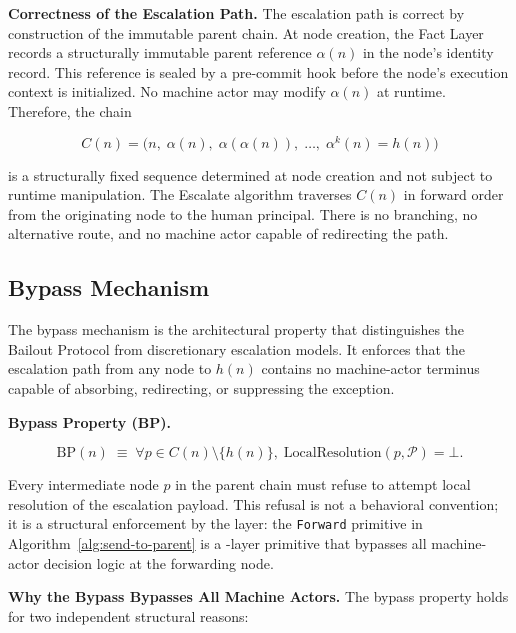 \textbf{Correctness of the Escalation Path.} The escalation path is correct by construction of the immutable parent chain. At node creation, the Fact Layer records a structurally immutable parent reference $\alpha(n)$ in the node's identity record. This reference is sealed by a pre-commit hook before the node's execution context is initialized. No machine actor may modify $\alpha(n)$ at runtime. Therefore, the chain

\[
C(n) = \bigl(n,\; \alpha(n),\; \alpha(\alpha(n)),\; \dots,\; \alpha^{k}(n) = h(n)\bigr)
\]

is a structurally fixed sequence determined at node creation and not subject to runtime manipulation. The Escalate algorithm traverses $C(n)$ in forward order from the originating node to the human principal. There is no branching, no alternative route, and no machine actor capable of redirecting the path.

\subsection{Bypass Mechanism}\label{sec:bypass}

The bypass mechanism is the architectural property that distinguishes the Bailout Protocol from discretionary escalation models. It enforces that the escalation path from any \bxthree{} node to $h(n)$ contains no machine-actor terminus capable of absorbing, redirecting, or suppressing the exception.

\medskip
\noindent\textbf{Bypass Property (BP).}

\[
\text{BP}(n) \;\equiv\; \forall p \in C(n) \setminus \{h(n)\},\; \text{LocalResolution}(p, \mathcal{P}) = \bot.
\tag{BP}
\]

Every intermediate node $p$ in the parent chain must refuse to attempt local resolution of the escalation payload. This refusal is not a behavioral convention; it is a structural enforcement by the \fact{} layer: the \texttt{Forward} primitive in Algorithm~\ref{alg:send-to-parent} is a \fact-layer primitive that bypasses all machine-actor decision logic at the forwarding node.

\medskip
\noindent\textbf{Why the Bypass Bypasses All Machine Actors.} The bypass property holds for two independent structural reasons:

